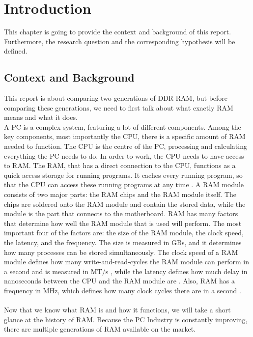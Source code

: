 \section{Introduction}

This chapter is going to provide the context and background of this report. Furthermore, the research question and the corresponding hypothesis will be defined.

\subsection{Context and Background}

This report is about comparing two generations of \gls{DDR} RAM, but before comparing these generations, we need to first talk about what exactly RAM means and what it does.
\\
A PC is a complex system, featuring a lot of different components. Among the key components, most importantly the \gls{CPU}, there is a specific amount of \gls{RAM} needed to function. The CPU is the centre of the PC, processing and calculating everything the PC needs to do. In order to work, the CPU needs to have access to RAM. The RAM, that has a direct connection to the CPU, functions as a quick access storage for running programs. It caches every running program, so that the CPU can access these running programs at any time \parencite{RAM_Definition}. A RAM module consists of two major parts: the RAM chips and the RAM module itself. The chips are soldered onto the RAM module and contain the stored data, while the module is the part that connects to the motherboard. RAM has many factors that determine how well the RAM module that is used will perform. The most important four of the factors are: the size of the RAM module, the clock speed, the latency, and the frequency. The size is measured in \gls{GB}s, and it determines how many processes can be stored simultaneously. The clock speed of a RAM module defines how many write-and-read-cycles the RAM module can perform in a second and is measured in MT/s \parencite{RAM_Speed}, while the latency defines how much delay in nanoseconds between the CPU and the RAM module are \parencite{RAM_Latency}. Also, RAM has a frequency in MHz, which defines how many clock cycles there are in a second \parencite{RAM_Speed}.
\\
\\
Now that we know what RAM is and how it functions, we will take a short glance at the history of RAM. Because the PC Industry is constantly improving, there are multiple generations of RAM available on the market.

